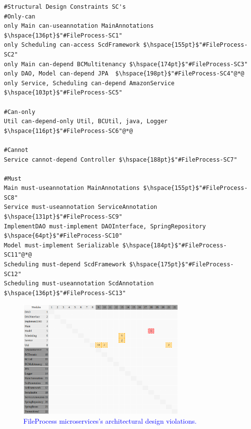 \documentclass[12pt]{article}
\begin{document}
\begin{lstlisting}[style=colorido, caption={\textcolor{blue}{FileProcess microservice's architectural design specification.}},label={list:especArquiteturalFileProccess}
]
#Structural Design Constraints SC's
#Only-can
only Main can-useannotation MainAnnotations	$\hspace{136pt}$"#FileProcess-SC1"
only Scheduling can-access ScdFramework $\hspace{155pt}$"#FileProcess-SC2"
only Main can-depend BCMultitenancy $\hspace{174pt}$"#FileProcess-SC3"
only DAO, Model can-depend JPA	$\hspace{198pt}$"#FileProcess-SC4"@*@
only Service, Scheduling can-depend AmazonService 	$\hspace{103pt}$"#FileProcess-SC5"

#Can-only
Util can-depend-only Util, BCUtil, java, Logger $\hspace{116pt}$"#FileProcess-SC6"@*@
    
#Cannot
Service cannot-depend Controller $\hspace{188pt}$"#FileProcess-SC7"
    
#Must
Main must-useannotation MainAnnotations	$\hspace{155pt}$"#FileProcess-SC8"
Service must-useannotation ServiceAnnotation $\hspace{131pt}$"#FileProcess-SC9"
ImplementDAO must-implement DAOInterface, SpringRepository $\hspace{64pt}$"#FileProcess-SC10"
Model must-implement Serializable $\hspace{184pt}$"#FileProcess-SC11"@*@
Scheduling must-depend ScdFramework $\hspace{175pt}$"#FileProcess-SC12"
Scheduling must-useannotation ScdAnnotation $\hspace{136pt}$"#FileProcess-SC13"
\end{lstlisting}

\begin{figure}[ht]
\centering
\includegraphics[width=0.75\textwidth]{figuras/violacoesFileProccess.png}
\caption{\textcolor{blue}{FileProcess microservices's architectural design violations.}}
\label{fig:microservices}
\end{figure}
\end{document}
